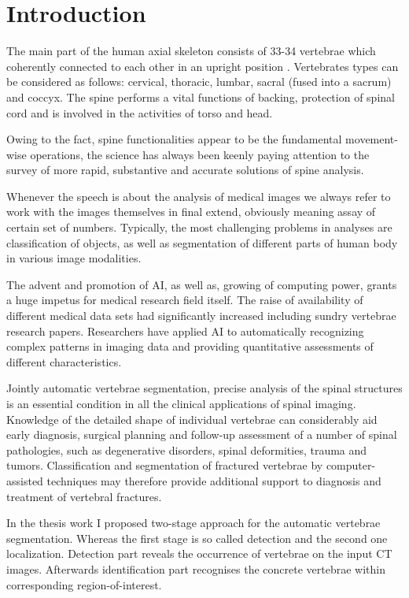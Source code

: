 \chapter{Introduction}
\label{ch:introduction}


The main part of the human axial skeleton consists of 33-34 vertebrae which coherently connected to each other in an upright position \cite{Ahlberg2005}. Vertebrates types can be considered as follows: cervical, thoracic, lumbar, sacral (fused into a sacrum) and coccyx. The spine performs a vital functions of backing, protection of spinal cord and is involved in the activities of torso and head.

Owing to the fact, spine functionalities appear to be the fundamental movement-wise operations, the science has always been keenly paying attention to the survey of more rapid, substantive and accurate solutions of spine analysis.
 
Whenever the speech is about the analysis of medical images we always refer to work with the images themselves in final extend, obviously meaning assay of certain set of numbers. Typically, the most challenging problems in analyses are classification of objects, as well as segmentation of different parts of human body in various image modalities.  
 
The advent and promotion of AI, as well as, growing of computing power, \cite{Pham2000} grants a huge impetus for medical research field itself. The raise of availability of different medical data sets had significantly increased including sundry vertebrae research papers. Researchers have applied AI to automatically recognizing complex patterns in imaging data and providing quantitative assessments of different characteristics.  
 
Jointly automatic vertebrae segmentation, precise analysis of the spinal structures is an essential condition in all the clinical applications of spinal imaging. Knowledge of the detailed shape of individual vertebrae can considerably aid early diagnosis, surgical planning and follow-up assessment of a number of spinal pathologies, such as degenerative disorders, spinal deformities, trauma and tumors. Classification and segmentation of fractured vertebrae by computer-assisted techniques may therefore provide additional support to diagnosis and treatment of vertebral fractures. 

In the thesis work I proposed two-stage approach for the automatic vertebrae segmentation. Whereas the first stage is so called detection and the second one localization. 
Detection part reveals the occurrence of vertebrae on the input CT images. Afterwards identification part recognises the concrete vertebrae within corresponding region-of-interest.